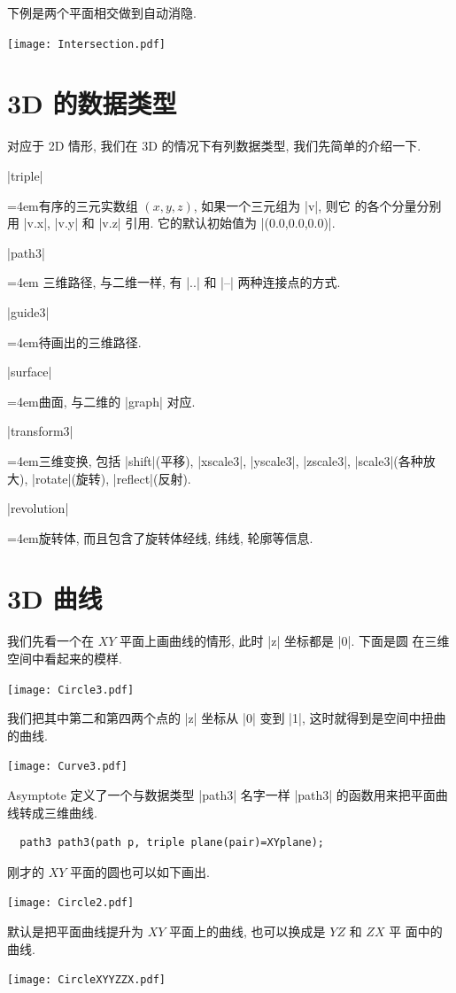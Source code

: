 \documentclass[nofonts,CJKnormalspaces]{ctexbook}
\newenvironment{funclist}{\trivlist
  \parindent=0pt
\item[]
  \def\item{\medskip\par\leftskip=0pt}
  \def\go{\par\leftskip=4em}}
{\endtrivlist}
\begin{document}
下例是两个平面相交做到自动消隐.
\begin{center}\texttt{[image: Intersection.pdf]}\end{center}%



\section{3D 的数据类型}
对应于 2D 情形, 我们在 3D 的情况下有列数据类型, 我们先简单的介绍一下.
\begin{funclist}
\item  |triple| \go 有序的三元实数组 $(x,y,z)$, 如果一个三元组为 |v|, 则它
  的各个分量分别用 |v.x|, |v.y| 和 |v.z| 引用. 它的默认初始值为 |(0.0,0.0,0.0)|.
\item  |path3| \go
  三维路径, 与二维一样, 有 |..| 和 |--| 两种连接点的方式.
\item  |guide3| \go 待画出的三维路径.
\item |surface| \go 曲面, 与二维的 |graph| 对应.
\item |transform3| \go 三维变换, 包括 |shift|(平移), |xscale3|, |yscale3|,
  |zscale3|, |scale3|(各种放大), |rotate|(旋转), |reflect|(反射).
\item |revolution| \go 旋转体, 而且包含了旋转体经线, 纬线, 轮廓等信息.
\end{funclist}

\section{3D 曲线}
我们先看一个在 $XY$ 平面上画曲线的情形, 此时 |z| 坐标都是 |0|. 下面是圆
在三维空间中看起来的模样.
\begin{center}\texttt{[image: Circle3.pdf]}\end{center}%

我们把其中第二和第四两个点的 |z| 坐标从 |0| 变到 |1|, 这时就得到是空间中扭曲
的曲线.
\begin{center}\texttt{[image: Curve3.pdf]}\end{center}%


Asymptote 定义了一个与数据类型 |path3| 名字一样 |path3| 的函数用来把平面曲
线转成三维曲线.
\begin{lstlisting}
  path3 path3(path p, triple plane(pair)=XYplane);
\end{lstlisting}

刚才的 $XY$ 平面的圆也可以如下画出.
\begin{center}\texttt{[image: Circle2.pdf]}\end{center}%

默认是把平面曲线提升为 $XY$ 平面上的曲线, 也可以换成是 $YZ$ 和 $ZX$ 平
面中的曲线.
\begin{center}\texttt{[image: CircleXYYZZX.pdf]}\end{center}%

\end{document}
